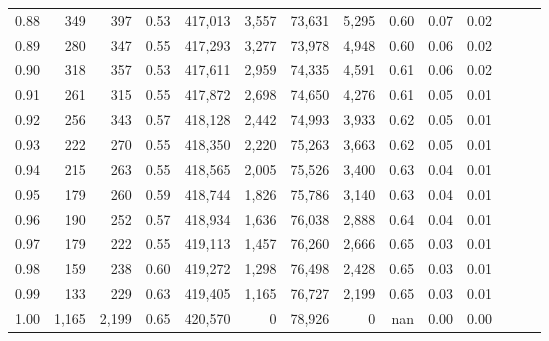 \begin{tabular}{rrrrrrrrrrrrrr}
0.88 &     349 &    397 &  0.53 &  417,013 &    3,557 &  73,631 &   5,295 &  0.60 &  0.07 &      0.02 \\
0.89 &     280 &    347 &  0.55 &  417,293 &    3,277 &  73,978 &   4,948 &  0.60 &  0.06 &      0.02 \\
0.90 &     318 &    357 &  0.53 &  417,611 &    2,959 &  74,335 &   4,591 &  0.61 &  0.06 &      0.02 \\
0.91 &     261 &    315 &  0.55 &  417,872 &    2,698 &  74,650 &   4,276 &  0.61 &  0.05 &      0.01 \\
0.92 &     256 &    343 &  0.57 &  418,128 &    2,442 &  74,993 &   3,933 &  0.62 &  0.05 &      0.01 \\
0.93 &     222 &    270 &  0.55 &  418,350 &    2,220 &  75,263 &   3,663 &  0.62 &  0.05 &      0.01 \\
0.94 &     215 &    263 &  0.55 &  418,565 &    2,005 &  75,526 &   3,400 &  0.63 &  0.04 &      0.01 \\
0.95 &     179 &    260 &  0.59 &  418,744 &    1,826 &  75,786 &   3,140 &  0.63 &  0.04 &      0.01 \\
0.96 &     190 &    252 &  0.57 &  418,934 &    1,636 &  76,038 &   2,888 &  0.64 &  0.04 &      0.01 \\
0.97 &     179 &    222 &  0.55 &  419,113 &    1,457 &  76,260 &   2,666 &  0.65 &  0.03 &      0.01 \\
0.98 &     159 &    238 &  0.60 &  419,272 &    1,298 &  76,498 &   2,428 &  0.65 &  0.03 &      0.01 \\
0.99 &     133 &    229 &  0.63 &  419,405 &    1,165 &  76,727 &   2,199 &  0.65 &  0.03 &      0.01 \\
1.00 &   1,165 &  2,199 &  0.65 &  420,570 &        0 &  78,926 &       0 &   nan &  0.00 &      0.00 \\
\bottomrule
\end{tabular}
